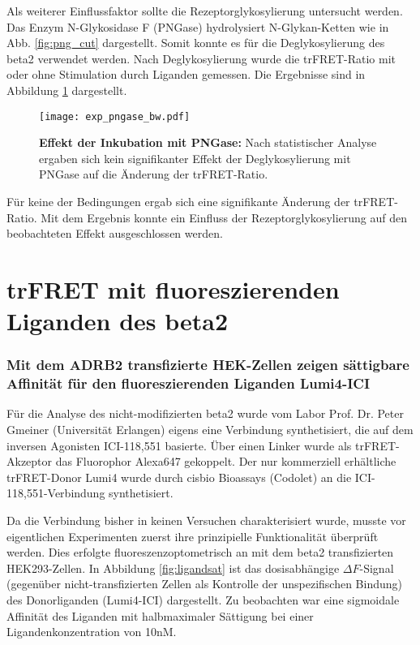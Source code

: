 Als weiterer Einflussfaktor sollte die Rezeptorglykosylierung untersucht werden. Das Enzym N-Glykosidase F (PNGase) hydrolysiert N-Glykan-Ketten wie in Abb. \ref{fig:png_cut} dargestellt. Somit konnte es für die Deglykosylierung des \gls{beta2} verwendet werden. Nach Deglykosylierung wurde die trFRET-Ratio mit oder ohne Stimulation durch Liganden gemessen. Die Ergebnisse sind in Abbildung \ref{fig:glycosylation} dargestellt.

\begin{figure}[htbp]
	\centering
    \texttt{[image: exp\_pngase\_bw.pdf]}
    \caption{\textbf{Effekt der Inkubation mit PNGase:} Nach statistischer Analyse ergaben sich kein signifikanter Effekt der Deglykosylierung mit PNGase auf die Änderung der trFRET-Ratio.} 
    \label{fig:glycosylation}
\end{figure}

Für keine der Bedingungen ergab sich eine signifikante Änderung der trFRET-Ratio. Mit dem Ergebnis konnte ein Einfluss der Rezeptorglykosylierung auf den beobachteten Effekt ausgeschlossen werden.

\section{trFRET mit fluoreszierenden Liganden des \gls{beta2}}
\label{ligandenfret}

\subsubsection{Mit dem ADRB2 transfizierte HEK-Zellen zeigen sättigbare Affinität für den fluoreszierenden Liganden Lumi4-ICI}

Für die Analyse des nicht-modifizierten \gls{beta2} wurde vom Labor Prof. Dr. Peter Gmeiner (Universität Erlangen) eigens eine Verbindung synthetisiert, die auf dem inversen Agonisten ICI-118,551 basierte. Über einen Linker wurde als trFRET-Akzeptor das Fluorophor Alexa647 gekoppelt. Der nur kommerziell erhältliche trFRET-Donor Lumi4 wurde durch cisbio Bioassays (Codolet) an die ICI-118,551-Verbindung synthetisiert.

Da die Verbindung bisher in keinen Versuchen charakterisiert wurde, musste vor eigentlichen Experimenten zuerst ihre prinzipielle Funktionalität überprüft werden. Dies erfolgte fluoreszenzoptometrisch an mit dem \gls{beta2} transfizierten HEK293-Zellen. In Abbildung \ref{fig:ligandsat} ist das dosisabhängige $\Delta F$-Signal (gegenüber nicht-transfizierten Zellen als Kontrolle der unspezifischen Bindung) des Donorliganden (Lumi4-ICI) dargestellt. Zu beobachten war eine sigmoidale Affinität des Liganden mit halbmaximaler Sättigung bei einer Ligandenkonzentration von 10\si{\nano M}.

